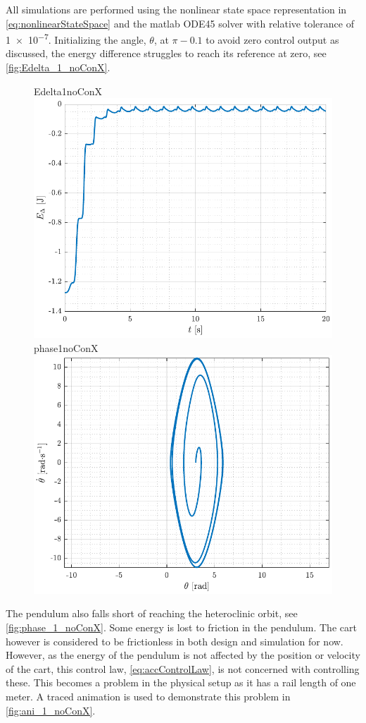 All simulations are performed using the nonlinear state space representation in \autoref{eq:nonlinearStateSpace} and the matlab ODE45 solver with relative tolerance of \SI{1e-7}{}. Initializing the angle, $\theta$, at $\pi-0.1$ to avoid zero control output as discussed, the energy difference struggles to reach its reference at zero, see \autoref{fig:Edelta_1_noConX}.
%
\begin{figure}[H]
  \hspace{-10pt}
  \captionbox
  {
    Edelta1noConX
    \label{fig:Edelta_1_noConX}
  }
  {
    \hspace{-1cm}
    \includegraphics[width=.46\textwidth]{figures/Edelta_1_noConX}
  }
  \hspace{20pt}
  \captionbox 
  {
    phase1noConX
    \label{fig:phase_1_noConX}
  }
  {
    \hspace{-1cm}
    \includegraphics[width=.46\textwidth]{figures/phase_1_noConX}
  }  
\end{figure}
%
The pendulum also falls short of reaching the heteroclinic orbit, see \autoref{fig:phase_1_noConX}. 
Some energy is lost to friction in the pendulum. The cart however is considered to be frictionless in both design and simulation for now.
%
However, as the energy of the pendulum is not affected by the position or velocity of the cart, this control law, \autoref{eq:accControlLaw}, is not concerned with controlling these. This becomes a problem in the physical setup as it has a rail length of one meter. A traced animation is used to demonstrate this problem in \autoref{fig:ani_1_noConX}.
